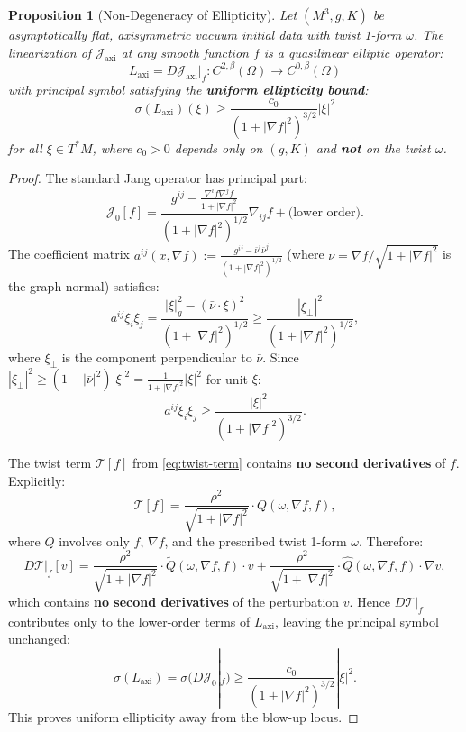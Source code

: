 \documentclass[12pt]{article}
\theoremstyle{plain}
\newtheorem{proposition}[theorem]{Proposition}
\theoremstyle{definition}
\theoremstyle{remark}
\newcommand{\Hoelder}{\beta}
\begin{document}
\begin{proposition}[Non-Degeneracy of Ellipticity]\label{prop:ellipticity-nondegen}
Let $(M^3, g, K)$ be asymptotically flat, axisymmetric vacuum initial data with twist 1-form $\omega$. The linearization of $\mathcal{J}_{\mathrm{axi}}$ at any smooth function $f$ is a quasilinear elliptic operator:
\[
L_{\mathrm{axi}} = D\mathcal{J}_{\mathrm{axi}}|_f : C^{2,\Hoelder}(\Omega) \to C^{0,\Hoelder}(\Omega)
\]
with principal symbol satisfying the \textbf{uniform ellipticity bound}:
\begin{equation}\label{eq:uniform-ellipticity}
\sigma(L_{\mathrm{axi}})(\xi) \geq \frac{c_0}{(1 + |\nabla f|^2)^{3/2}} |\xi|^2
\end{equation}
for all $\xi \in T^*M$, where $c_0 > 0$ depends only on $(g, K)$ and \textbf{not} on the twist $\omega$.
\end{proposition}

\begin{proof}
The standard Jang operator has principal part:
\[
\mathcal{J}_0[f] = \frac{g^{ij} - \frac{\nabla^i f \nabla^j f}{1 + |\nabla f|^2}}{(1 + |\nabla f|^2)^{1/2}} \nabla_{ij} f + \text{(lower order)}.
\]
The coefficient matrix $a^{ij}(x, \nabla f) := \frac{g^{ij} - \bar{\nu}^i \bar{\nu}^j}{(1 + |\nabla f|^2)^{1/2}}$ (where $\bar{\nu} = \nabla f / \sqrt{1 + |\nabla f|^2}$ is the graph normal) satisfies:
\[
a^{ij}\xi_i \xi_j = \frac{|\xi|_g^2 - (\bar{\nu} \cdot \xi)^2}{(1 + |\nabla f|^2)^{1/2}} \geq \frac{|\xi_\perp|^2}{(1 + |\nabla f|^2)^{1/2}},
\]
where $\xi_\perp$ is the component perpendicular to $\bar{\nu}$. Since $|\xi_\perp|^2 \geq (1 - |\bar{\nu}|^2)|\xi|^2 = \frac{1}{1+|\nabla f|^2}|\xi|^2$ for unit $\xi$:
\[
a^{ij}\xi_i\xi_j \geq \frac{|\xi|^2}{(1 + |\nabla f|^2)^{3/2}}.
\]

The twist term $\mathcal{T}[f]$ from \eqref{eq:twist-term} contains \textbf{no second derivatives} of $f$. Explicitly:
\[
\mathcal{T}[f] = \frac{\rho^2}{\sqrt{1 + |\nabla f|^2}} \cdot Q(\omega, \nabla f, f),
\]
where $Q$ involves only $f$, $\nabla f$, and the prescribed twist 1-form $\omega$. Therefore:
\[
D\mathcal{T}|_f[v] = \frac{\rho^2}{\sqrt{1 + |\nabla f|^2}} \cdot \tilde{Q}(\omega, \nabla f, f) \cdot v + \frac{\rho^2}{\sqrt{1 + |\nabla f|^2}} \cdot \hat{Q}(\omega, \nabla f, f) \cdot \nabla v,
\]
which contains \textbf{no second derivatives} of the perturbation $v$. Hence $D\mathcal{T}|_f$ contributes only to the lower-order terms of $L_{\mathrm{axi}}$, leaving the principal symbol unchanged:
\[
\sigma(L_{\mathrm{axi}}) = \sigma(D\mathcal{J}_0|_f) \geq \frac{c_0}{(1 + |\nabla f|^2)^{3/2}} |\xi|^2.
\]
This proves uniform ellipticity away from the blow-up locus.
\end{proof}
\end{document}

